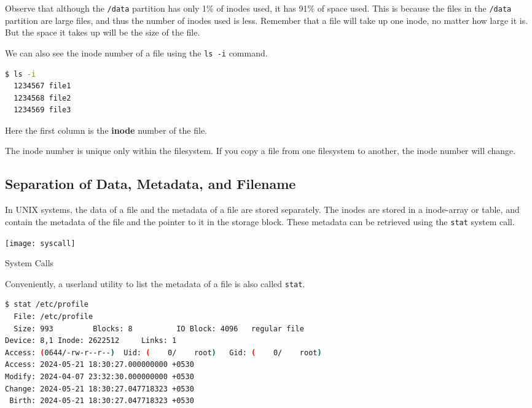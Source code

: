 Observe that although the \texttt{/data} partition has only 1\% of inodes used, it has 91\% of space used.
This is because the files in the \texttt{/data} partition are large files, and thus the number of inodes used is less.
Remember that a file will take up one inode, no matter how large it is.
But the space it takes up will be the size of the file.

We can also see the inode number of a file using the \texttt{ls -i} command.

\begin{lstlisting}[language=bash]
$ ls -i
  1234567 file1
  1234568 file2
  1234569 file3
\end{lstlisting}

Here the first column is the \textbf{inode} number of the file.

\begin{remark}
  The inode number is unique only within the filesystem.
  If you copy a file from one filesystem to another, the inode number will change.
\end{remark}

\subsection{Separation of Data, Metadata, and Filename}

In UNIX systems, the data of a file and the metadata of a file are stored separately.
The inodes are stored in a inode-array or table, and contain the metadata of the file and the pointer to it in the storage block.
These metadata can be retrieved using the \texttt{stat} system call.

\begin{marginfigure}
  \texttt{[image: syscall]}
  \caption[System Calls]{System Calls}
\end{marginfigure}

Conveniently, a userland utility to list the metadata of a file is also called \texttt{stat}.

\begin{lstlisting}[language=bash]
$ stat /etc/profile
  File: /etc/profile
  Size: 993       	Blocks: 8          IO Block: 4096   regular file
Device: 8,1	Inode: 2622512     Links: 1
Access: (0644/-rw-r--r--)  Uid: (    0/    root)   Gid: (    0/    root)
Access: 2024-05-21 18:30:27.000000000 +0530
Modify: 2024-04-07 23:32:30.000000000 +0530
Change: 2024-05-21 18:30:27.047718323 +0530
 Birth: 2024-05-21 18:30:27.047718323 +0530
\end{lstlisting}

